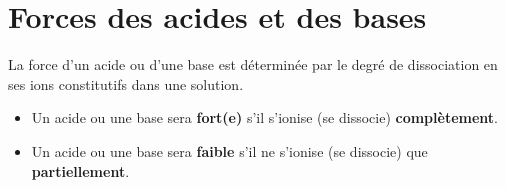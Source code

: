 \documentclass[
  11pt,
  french,
  a4paper,
  openany]{book}
\providecommand{\tightlist}{%
  \setlength{\itemsep}{0pt}\setlength{\parskip}{0pt}}
\begin{document}
\clearpage

\hypertarget{forces-des-acides-et-des-bases}{%
\section{Forces des acides et des bases}\label{forces-des-acides-et-des-bases}}

La force d'un acide ou d'une base est déterminée par le degré de dissociation en ses ions constitutifs dans une solution.

\begin{itemize}
\tightlist
\item
  Un acide ou une base sera \textbf{fort(e)} s'il s'ionise (se dissocie) \textbf{complètement}.
\item
  Un acide ou une base sera \textbf{faible} s'il ne s'ionise (se dissocie) que \textbf{partiellement}.
\end{itemize}
\end{document}
